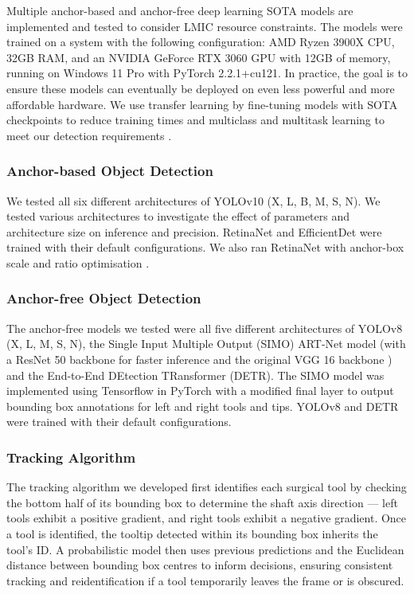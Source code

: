 Multiple anchor-based and anchor-free deep learning SOTA models are implemented and tested to consider LMIC resource constraints. The models were trained on a system with the following configuration: AMD Ryzen 3900X CPU, 32GB RAM, and an NVIDIA GeForce RTX 3060 GPU with 12GB of memory, running on Windows 11 Pro with PyTorch 2.2.1+cu121. In practice, the goal is to ensure these models can eventually be deployed on even less powerful and more affordable hardware. We use transfer learning by fine-tuning models with SOTA checkpoints to reduce training times and multiclass and multitask learning to meet our detection requirements \cite{alabi_multitask_2024}.

\subsubsection{Anchor-based Object Detection}

We tested all six different architectures of YOLOv10 (X, L, B, M, S, N). We tested various architectures to investigate the effect of parameters and architecture size on inference and precision. RetinaNet and EfficientDet were trained with their default configurations. We also ran RetinaNet with anchor-box scale and ratio optimisation \cite{zlocha_improving_2019}.

\subsubsection{Anchor-free Object Detection}

The anchor-free models we tested were all five different architectures of YOLOv8 (X, L, M, S, N), the Single Input Multiple Output (SIMO) ART-Net model (with a ResNet 50 backbone for faster inference \cite{koonce_resnet_2021} and the original VGG 16 backbone \cite{hasan_detection_2021}) and the End-to-End DEtection TRansformer (DETR). The SIMO model was implemented using Tensorflow in PyTorch with a modified final layer to output bounding box annotations for left and right tools and tips. YOLOv8 and DETR were trained with their default configurations.

\subsubsection{Tracking Algorithm}

The tracking algorithm we developed first identifies each surgical tool by checking the bottom half of its bounding box to determine the shaft axis direction — left tools exhibit a positive gradient, and right tools exhibit a negative gradient. Once a tool is identified, the tooltip detected within its bounding box inherits the tool's ID. A probabilistic model then uses previous predictions and the Euclidean distance between bounding box centres to inform decisions, ensuring consistent tracking and reidentification if a tool temporarily leaves the frame or is obscured.

